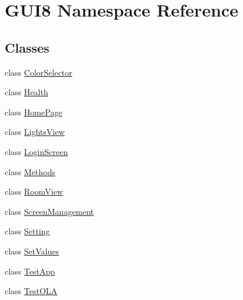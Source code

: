 \hypertarget{namespaceGUI8}{}\section{G\+U\+I8 Namespace Reference}
\label{namespaceGUI8}
\subsection*{Classes}
\begin{DoxyCompactItemize}
\item 
class \hyperlink{classGUI8_1_1ColorSelector}{Color\+Selector}
\item 
class \hyperlink{classGUI8_1_1Health}{Health}
\item 
class \hyperlink{classGUI8_1_1HomePage}{Home\+Page}
\item 
class \hyperlink{classGUI8_1_1LightsView}{Lights\+View}
\item 
class \hyperlink{classGUI8_1_1LoginScreen}{Login\+Screen}
\item 
class \hyperlink{classGUI8_1_1Methods}{Methods}
\item 
class \hyperlink{classGUI8_1_1RoomView}{Room\+View}
\item 
class \hyperlink{classGUI8_1_1ScreenManagement}{Screen\+Management}
\item 
class \hyperlink{classGUI8_1_1Setting}{Setting}
\item 
class \hyperlink{classGUI8_1_1SetValues}{Set\+Values}
\item 
class \hyperlink{classGUI8_1_1TestApp}{Test\+App}
\item 
class \hyperlink{classGUI8_1_1TestOLA}{Test\+O\+LA}
\end{DoxyCompactItemize}
